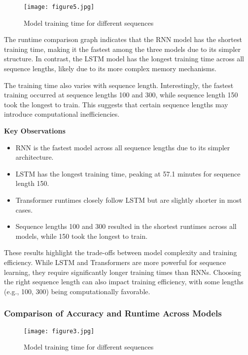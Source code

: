 \documentclass{article}
\begin{document}
\begin{figure}[H] 
    \centering
    \ifpdf
        \texttt{[image: figure5.jpg]}  %
    \fi
    \caption{Model training time for different sequences}
    \label{fig:model_training_runtime}
\end{figure}

The runtime comparison graph indicates that the RNN model has the shortest training time, making it the fastest among the three models due to its simpler structure. In contrast, the LSTM model has the longest training time across all sequence lengths, likely due to its more complex memory mechanisms.

The training time also varies with sequence length. Interestingly, the fastest training occurred at sequence lengths 100 and 300, while sequence length 150 took the longest to train. This suggests that certain sequence lengths may introduce computational inefficiencies.

\textbf{Key Observations}
\begin{itemize}
    \item RNN is the fastest model across all sequence lengths due to its simpler architecture.
    \item LSTM has the longest training time, peaking at 57.1 minutes for sequence length 150.
    \item Transformer runtimes closely follow LSTM but are slightly shorter in most cases.
    \item Sequence lengths 100 and 300 resulted in the shortest runtimes across all models, while 150 took the longest to train.

\end{itemize}

These results highlight the trade-offs between model complexity and training efficiency. While LSTM and Transformers are more powerful for sequence learning, they require significantly longer training times than RNNs. Choosing the right sequence length can also impact training efficiency, with some lengths (e.g., 100, 300) being computationally favorable.

\subsubsection{Comparison of Accuracy and Runtime Across Models}

\begin{figure}[H] 
    \centering
    \ifpdf
        \texttt{[image: figure3.jpg]}  %
    \fi
    \caption{Model training time for different sequences}
    \label{fig:model_training_accuracy_runtime}
\end{figure}
\end{document}
